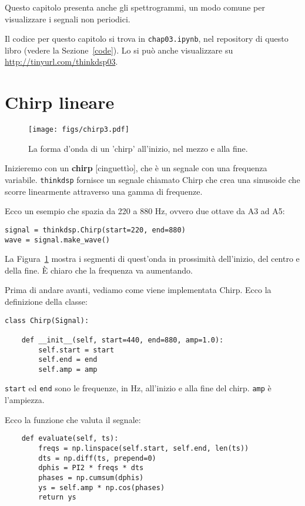 \documentclass[12pt]{book} \usepackage[width=5.5in,height=8.5in, hmarginratio=3:2,vmarginratio=1:1]{geometry}
\begin{document}
Questo capitolo presenta anche gli spettrogrammi, un modo comune per visualizzare i segnali non periodici.

Il codice per questo capitolo si trova in {\tt chap03.ipynb}, nel repository di questo libro (vedere la Sezione~\ref{code}). Lo si può anche visualizzare su \url{http://tinyurl.com/thinkdsp03}.

\section{Chirp lineare} 

\begin{figure} 

\centerline{\texttt{[image: figs/chirp3.pdf]}} \caption{La forma d'onda di un 'chirp' all'inizio, nel mezzo e alla fine.} \label{fig.chirp3} \end{figure} 

Inizieremo con un {\bf chirp} [cinguettìo], che è un segnale con una frequenza variabile. {\tt thinkdsp} fornisce un segnale chiamato Chirp che crea una sinusoide che scorre linearmente attraverso una gamma di frequenze.

Ecco un esempio che spazia da 220 a 880 Hz, ovvero due ottave da A3 ad A5:

\begin{verbatim} 
signal = thinkdsp.Chirp(start=220, end=880)
wave = signal.make_wave()
 \end{verbatim} 

La Figura~\ref{fig.chirp3} mostra i segmenti di quest'onda in prossimità dell'inizio, del centro e della fine. È chiaro che la frequenza va aumentando.

Prima di andare avanti, vediamo come viene implementata Chirp. Ecco la definizione della classe:

\begin{verbatim} 
class Chirp(Signal):

    def __init__(self, start=440, end=880, amp=1.0):
        self.start = start
        self.end = end
        self.amp = amp
 \end{verbatim} 

{\tt start} ed {\tt end} sono le frequenze, in Hz, all'inizio e alla fine del chirp. {\tt amp} è l'ampiezza.

Ecco la funzione che valuta il segnale:

\begin{verbatim} 
    def evaluate(self, ts):
        freqs = np.linspace(self.start, self.end, len(ts))
        dts = np.diff(ts, prepend=0)
        dphis = PI2 * freqs * dts
        phases = np.cumsum(dphis)
        ys = self.amp * np.cos(phases)
        return ys
 \end{verbatim} 
\end{document}
